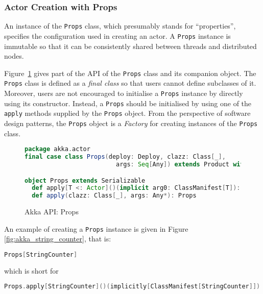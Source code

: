\begin{comment}
In Akka 2.2, the {\tt 
Stash} trait can be used to pending the process of a particular message until 
the current behaviour is updated.
\end{comment}



\subsubsection{Actor Creation with Props}
\label{akka_props}

An instance of the {\tt Props} class, which presumably stands for ``properties'', 
specifies the configuration used in creating an actor. A {\tt Props} instance 
is immutable so that it can be consistently shared between threads and 
distributed nodes.  

Figure~\ref{akka_props_api} gives part of the API of the {\tt Props} class and 
its companion object.  The {\tt Props} class is defined as a {\it final class} 
so that 
users cannot define subclasses of it.  Moreover, users are not encouraged to 
initialise a {\tt Props} instance by directly using its constructor.  Instead, a 
{\tt Props} should be initialised by using one of the {\tt apply} methods 
supplied by the {\tt Props} object.  From the perspective of software design 
patterns, the {\tt Props} object is a {\it Factory} for creating instances of 
the {\tt Props} class.

\begin{figure}[h]
\begin{lstlisting}[language=scala]
package akka.actor
final case class Props(deploy: Deploy, clazz: Class[_], 
                         args: Seq[Any]) extends Product with Serializable

object Props extends Serializable
  def apply[T <: Actor]()(implicit arg0: ClassManifest[T]): Props
  def apply(clazz: Class[_], args: Any*): Props
\end{lstlisting}
\caption{Akka API: Props}
\label{akka_props_api}
\end{figure}

An example of creating a {\tt Props} instance is given in Figure 
\ref{fig:akka_string_counter}, that is:

\begin{lstlisting}[language=scala]
  Props[StringCounter]
\end{lstlisting}
which is short for
\begin{lstlisting}[language=scala]  
  Props.apply[StringCounter]()(implicitly[ClassManifest[StringCounter]])
\end{lstlisting}

